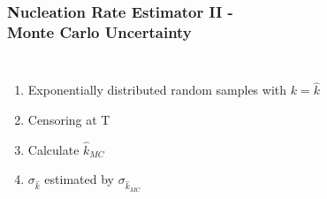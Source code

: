 \documentclass[smaller,notes=hide]{beamer}
\newlength{\wideitemsep}
\let\olditem\item
\renewcommand{\item}{\setlength{\itemsep}{\wideitemsep}\olditem}
\begin{document}
\begin{frame}
\frametitle{Nucleation Rate Estimator II -\\ \hfill Monte Carlo Uncertainty}
\begin{columns}
\begin{enumerate}
\item Exponentially distributed random samples with $k = \hat{k}$
\item Censoring at T
\item Calculate $\hat{k}_{MC}$
\item<2> $\sigma_{\hat{k}}$ estimated by $\sigma_{\hat{k}_{MC}}$
\end{enumerate}





\end{columns}
\end{frame}
\end{document}

